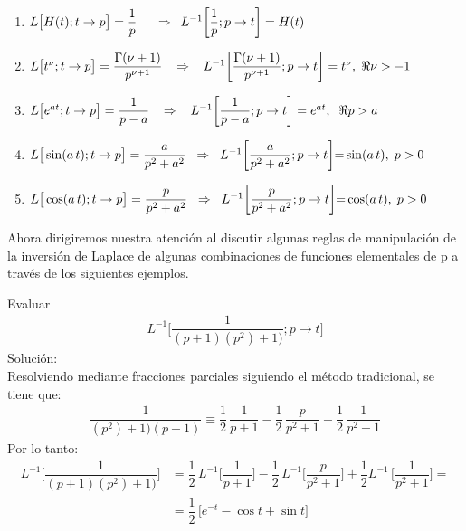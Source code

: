 \begin{enumerate}[label=\alph*)]
\item $ L \big[ H (t); t \to p \big] = \dfrac{1}{p} \hspace{0.5cm} \Rightarrow \hspace{0.5em} L^{-1} \bigg[ \dfrac{1}{p}; p \to t \bigg] = H (t)$
\item $ L \big[ t^{\nu}; t \to p \big] = \dfrac{\Gamma(\nu + 1)}{p^{\nu + 1}} \hspace{0.3cm} \Rightarrow \hspace{0.3cm} L^{-1} \bigg[ \dfrac{\Gamma(\nu + 1)}{p^{\nu + 1}}; p \to t \bigg] = t^{\nu}, \hspace{0.1cm} \Re{\nu} > - 1$
\item $ L \big[ e^{a t}; t \to p \big] = \dfrac{1}{p - a} \hspace{0.3cm} \Rightarrow \hspace{0.3cm} L^{-1} \bigg[ \dfrac{1}{p - a}; p \to t \bigg] = e^{a t}, \hspace{0.2cm} \Re{p} > a$
\item $ L \big[ \sin (a \, t); t \to p \big] = \dfrac{a}{p^{2} + a^{2}} \hspace{0.2cm} \Rightarrow \hspace{0.2cm} L^{-1} \bigg[ \dfrac{a}{p^{2} + a^{2}}; p \to t \bigg] {=} \sin (a \, t), \hspace{0.1cm} p > 0$
\item $ L \big[ \cos (a \, t); t \to p \big] = \dfrac{p}{p^{2} + a^{2}} \hspace{0.2cm} \Rightarrow \hspace{0.2cm} L^{-1} \bigg[ \dfrac{p}{p^{2} + a^{2}}; p \to t \bigg] {=} \cos (a \, t), \hspace{0.1cm} p > 0$
\end{enumerate}
Ahora dirigiremos nuestra atención al discutir algunas reglas de manipulación de la inversión de Laplace de algunas combinaciones de funciones elementales de p a través de los siguientes ejemplos.
\begin{ejemplo}
Evaluar
\begin{align*}
L^{-1} \bigg[ \dfrac{1}{(p + 1)(p^2) + 1)}; p \to t \bigg]
\end{align*}
Solución:
\\[0.5em]
Resolviendo mediante fracciones parciales siguiendo el método tradicional, se tiene que:
\begin{align*}
\dfrac{1}{(p^2) + 1)(p + 1)} \equiv \dfrac{1}{2} \, \dfrac{1}{p + 1} - \dfrac{1}{2} \, \dfrac{p}{p^{2} + 1} + \dfrac{1}{2} \, \dfrac{1}{p^{2} + 1}
\end{align*}
Por lo tanto:
\begin{align*}
L^{-1} \bigg[ \dfrac{1}{(p + 1)(p^2) + 1)}\bigg] &= \dfrac{1}{2} \, L^{-1} \bigg[ \dfrac{1}{p + 1}\bigg] {-} \dfrac{1}{2} \, L^{-1} \bigg[\dfrac{p}{p^{2} + 1} \bigg] {+} \dfrac{1}{2} L^{-1} \, \bigg[\dfrac{1}{p^{2} + 1} \bigg] = \\[0.5em]
&= \dfrac{1}{2} \, \big[  e^{-t} - \cos t + \sin t  \big]
\end{align*}
\end{ejemplo}
